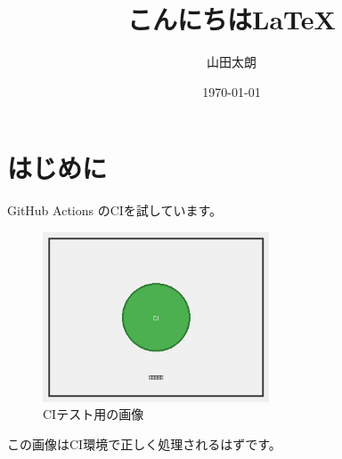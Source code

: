 \documentclass[uplatex]{jsarticle}
\title{こんにちは\LaTeX}
\author{山田太朗}
\date{\today}
\begin{document}
\maketitle

\section{はじめに}

GitHub Actions のCIを試しています。

\begin{figure}[htbp]
	\centering
	\includegraphics[width=0.6\textwidth]{figures/test-image.png}
	\caption{CIテスト用の画像}
	\label{fig:test-image}
\end{figure}

この画像はCI環境で正しく処理されるはずです。\cite{fujita2020}



\end{document}
